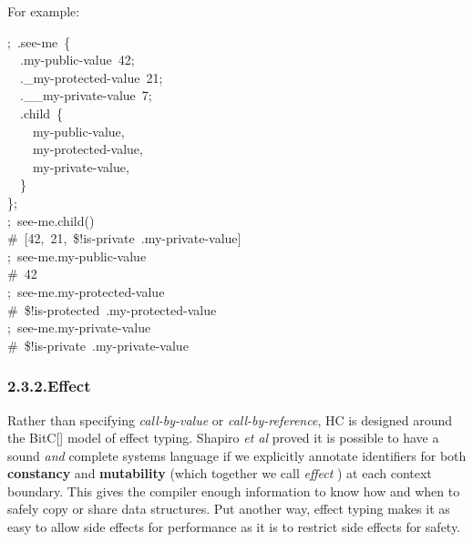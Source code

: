 \documentclass[preprint]{{acmart}}
\begin{document}
\noindent{}For example:%
\begin{mdpre}%
\noindent;~.see-me~\{\\
~~.my-public-value~{42};\\
~~.\_my-protected-value~{21};\\
~~.\_\_my-private-value~7;\\
~~.child~\{\\
~~~~my-public-value,\\
~~~~my-protected-value,\\
~~~~my-private-value,\\
~~\}\\
\};\\
;~see-me.child()\\
{\#~{}[42,~21,~\$!is-private~.my-private-value]}\\
;~see-me.my-public-value\\
{\#~42}\\
;~see-me.my-protected-value\\
{\#~\$!is-protected~.my-protected-value}\\
;~see-me.my-private-value\\
{\#~\$!is-private~.my-private-value}\\
\end{mdpre}
\subsubsection{2.3.2.\hspace*{0.5em}Effect}\label{sec-effect}%

\noindent{}Rather than specifying \emph{call-by-value} or \emph{call-by-reference}, HC is
designed around the BitC[] model of effect typing. Shapiro \emph{et al}
proved it is possible to have a sound \emph{and} complete systems language if
we explicitly annotate identifiers for both \textbf{constancy} and
\textbf{mutability} (which together we call \emph{effect} ) at each context
boundary. This gives the compiler enough information to know how and when
to safely copy or share data structures. Put another way, effect typing
makes it as easy to allow side effects for performance as it is to
restrict side effects for safety.%
\end{document}
